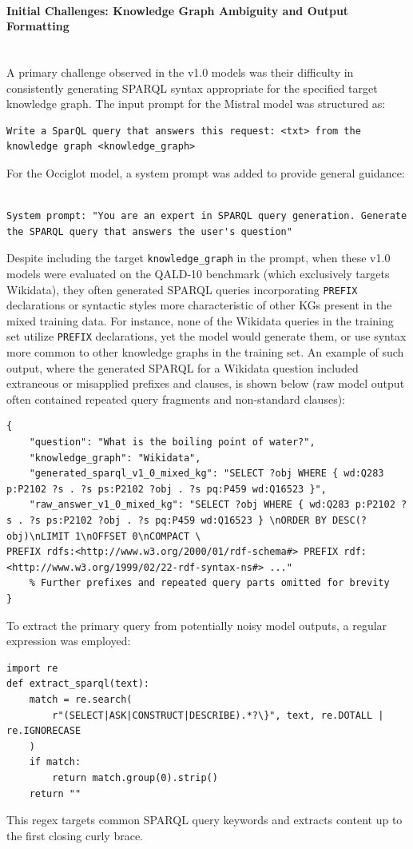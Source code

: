 \paragraph{Initial Challenges: Knowledge Graph Ambiguity and Output Formatting}\mbox{}\\
A primary challenge observed in the v1.0 models was their difficulty in consistently generating SPARQL syntax appropriate for the specified target knowledge graph.
The input prompt for the Mistral model was structured as:
\begin{lstlisting}[breaklines]
Write a SparQL query that answers this request: <txt> from the knowledge graph <knowledge_graph>
\end{lstlisting}
For the Occiglot model, a system prompt was added to provide general guidance:
\begin{lstlisting}[breaklines]

System prompt: "You are an expert in SPARQL query generation. Generate the SPARQL query that answers the user's question"
\end{lstlisting}
Despite including the target \texttt{knowledge\_graph} in the prompt, when these v1.0 models were evaluated on the QALD-10 benchmark (which exclusively targets Wikidata), they often generated SPARQL queries incorporating \texttt{PREFIX} declarations or syntactic styles more characteristic of other KGs present in the mixed training data. 
For instance, none of the Wikidata queries in the training set utilize \texttt{PREFIX} declarations, yet the model would generate them, or use syntax more common to other knowledge graphs in the training set.
An example of such output, where the generated SPARQL for a Wikidata question included extraneous or misapplied prefixes and clauses, is shown below (raw model output often contained repeated query fragments and non-standard clauses):
\begin{lstlisting}[breaklines]
{
    "question": "What is the boiling point of water?",
    "knowledge_graph": "Wikidata",
    "generated_sparql_v1_0_mixed_kg": "SELECT ?obj WHERE { wd:Q283 p:P2102 ?s . ?s ps:P2102 ?obj . ?s pq:P459 wd:Q16523 }",
    "raw_answer_v1_0_mixed_kg": "SELECT ?obj WHERE { wd:Q283 p:P2102 ?s . ?s ps:P2102 ?obj . ?s pq:P459 wd:Q16523 } \nORDER BY DESC(?obj)\nLIMIT 1\nOFFSET 0\nCOMPACT \
PREFIX rdfs:<http://www.w3.org/2000/01/rdf-schema#> PREFIX rdf:<http://www.w3.org/1999/02/22-rdf-syntax-ns#> ..." 
    % Further prefixes and repeated query parts omitted for brevity
}
\end{lstlisting}
To extract the primary query from potentially noisy model outputs, a regular expression was employed:
\begin{verbatim}
import re
def extract_sparql(text):
    match = re.search(
        r"(SELECT|ASK|CONSTRUCT|DESCRIBE).*?\}", text, re.DOTALL | re.IGNORECASE
    )
    if match:
        return match.group(0).strip()
    return ""
\end{verbatim}
This regex targets common SPARQL query keywords and extracts content up to the first closing curly brace.

